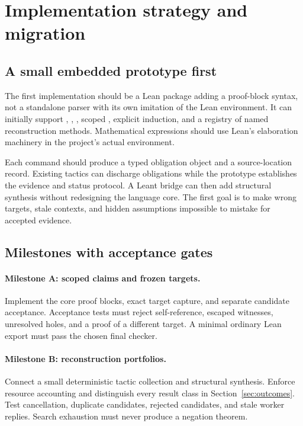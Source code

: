 \documentclass[11pt,a4paper]{article}
\newcommand{\code}[1]{\texttt{\detokenize{#1}}}
\theoremstyle{remark}
\begin{document}
\section{Implementation strategy and migration}\label{sec:implementation}

\subsection{A small embedded prototype first}

The first implementation should be a Lean package adding a proof-block syntax, not a standalone parser with its own imitation of the Lean environment. It can initially support \code{claim}, \code{from}, \code{suffices}, scoped \code{obtain}, explicit induction, and a registry of named reconstruction methods. Mathematical expressions should use Lean's elaboration machinery in the project's actual environment.

Each command should produce a typed obligation object and a source-location record. Existing tactics can discharge obligations while the prototype establishes the evidence and status protocol. A Leant bridge can then add structural synthesis without redesigning the language core. The first goal is to make wrong targets, stale contexts, and hidden assumptions impossible to mistake for accepted evidence.

\subsection{Milestones with acceptance gates}

\paragraph{Milestone A: scoped claims and frozen targets.}
Implement the core proof blocks, exact target capture, and separate candidate acceptance. Acceptance tests must reject self-reference, escaped witnesses, unresolved holes, and a proof of a different target. A minimal ordinary Lean export must pass the chosen final checker.

\paragraph{Milestone B: reconstruction portfolios.}
Connect a small deterministic tactic collection and structural synthesis. Enforce resource accounting and distinguish every result class in Section~\ref{sec:outcomes}. Test cancellation, duplicate candidates, rejected candidates, and stale worker replies. Search exhaustion must never produce a negation theorem.
\end{document}
